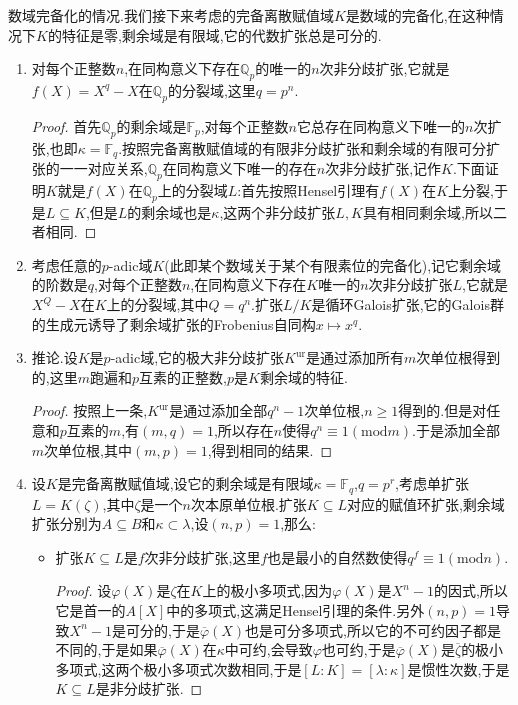 数域完备化的情况.我们接下来考虑的完备离散赋值域$K$是数域的完备化,在这种情况下$K$的特征是零,剩余域是有限域,它的代数扩张总是可分的.
\begin{enumerate}
	\item 对每个正整数$n$,在同构意义下存在$\mathbb{Q}_p$的唯一的$n$次非分歧扩张,它就是$f(X)=X^q-X$在$\mathbb{Q}_p$的分裂域,这里$q=p^n$.
	\begin{proof}
		
		首先$\mathbb{Q}_p$的剩余域是$\mathbb{F}_p$,对每个正整数$n$它总存在同构意义下唯一的$n$次扩张,也即$\kappa=\mathbb{F}_q$.按照完备离散赋值域的有限非分歧扩张和剩余域的有限可分扩张的一一对应关系,$\mathbb{Q}_p$在同构意义下唯一的存在$n$次非分歧扩张,记作$K$.下面证明$K$就是$f(X)$在$\mathbb{Q}_p$上的分裂域$L$:首先按照Hensel引理有$f(X)$在$K$上分裂,于是$L\subseteq K$,但是$L$的剩余域也是$\kappa$,这两个非分歧扩张$L,K$具有相同剩余域,所以二者相同.
	\end{proof}
    \item 考虑任意的$p$-adic域$K$(此即某个数域关于某个有限素位的完备化),记它剩余域的阶数是$q$,对每个正整数$n$,在同构意义下存在$K$唯一的$n$次非分歧扩张$L$,它就是$X^Q-X$在$K$上的分裂域,其中$Q=q^n$.扩张$L/K$是循环Galois扩张,它的Galois群的生成元诱导了剩余域扩张的Frobenius自同构$x\mapsto x^q$.
    \item 推论.设$K$是$p$-adic域,它的极大非分歧扩张$K^{\mathrm{ur}}$是通过添加所有$m$次单位根得到的,这里$m$跑遍和$p$互素的正整数,$p$是$K$剩余域的特征.
    \begin{proof}
    	
    	按照上一条,$K^{\mathrm{ur}}$是通过添加全部$q^n-1$次单位根,$n\ge1$得到的.但是对任意和$p$互素的$m$,有$(m,q)=1$,所以存在$n$使得$q^n\equiv1(\mathrm{mod}m)$.于是添加全部$m$次单位根,其中$(m,p)=1$,得到相同的结果.
    \end{proof}
    \item 设$K$是完备离散赋值域,设它的剩余域是有限域$\kappa=\mathbb{F}_q$,$q=p^r$,考虑单扩张$L=K(\zeta)$,其中$\zeta$是一个$n$次本原单位根.扩张$K\subseteq L$对应的赋值环扩张,剩余域扩张分别为$A\subseteq B$和$\kappa\subset\lambda$,设$(n,p)=1$,那么:
    \begin{itemize}
    	\item 扩张$K\subseteq L$是$f$次非分歧扩张,这里$f$也是最小的自然数使得$q^f\equiv1(\mathrm{mod}n)$.
    	\begin{proof}
    		
    		设$\varphi(X)$是$\zeta$在$K$上的极小多项式,因为$\varphi(X)$是$X^n-1$的因式,所以它是首一的$A[X]$中的多项式,这满足Hensel引理的条件.另外$(n,p)=1$导致$X^n-1$是可分的,于是$\overline{\varphi}(X)$也是可分多项式,所以它的不可约因子都是不同的,于是如果$\overline{\varphi}(X)$在$\kappa$中可约,会导致$\varphi$也可约,于是$\overline{\varphi}(X)$是$\overline{\zeta}$的极小多项式,这两个极小多项式次数相同,于是$[L:K]=[\lambda:\kappa]$是惯性次数,于是$K\subseteq L$是非分歧扩张.
    		

\end{proof}
\end{itemize}
\end{enumerate}
